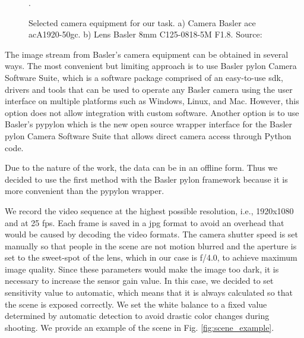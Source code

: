     \begin{figure}[h]
        \centering
        \qquad
        \caption{Selected camera equipment for our task. a) Camera Basler ace acA1920-50gc. b) Lens Basler 8mm  C125-0818-5M F1.8. Source: \cite{baslercamera, baslerlens}}.
        \label{fig:camera_equipment}
    \end{figure}
    
    The image stream from Basler's camera equipment can be obtained in several ways. The most convenient but limiting approach is to use Basler pylon Camera Software Suite, which is a software package comprised of an easy-to-use \gls{sdk}, drivers and tools that can be used to operate any Basler camera using the user interface on multiple platforms such as Windows, Linux, and Mac. However, this option does not allow integration with custom software. Another option is to use Basler's pypylon \cite{baslerpypylon} which is the new open source wrapper interface for the Basler pylon Camera Software Suite that allows direct camera access through Python code.
    
    Due to the nature of the work, the data can be in an offline form. Thus we decided to use the first method with the Basler pylon framework because it is more convenient than the pypylon wrapper.
    
    We record the video sequence at the highest possible resolution, i.e., 1920x1080 and at 25 \gls{fps}. Each frame is saved in a jpg format to avoid an overhead that would be caused by decoding the video formats. The camera shutter speed is set manually so that people in the scene are not motion blurred and the aperture is set to the sweet-spot of the lens, which in our case is f/4.0, to achieve maximum image quality. Since these parameters would make the image too dark, it is necessary to increase the sensor gain value. In this case, we decided to set sensitivity value to automatic, which means that it is always calculated so that the scene is exposed correctly.  We set the white balance to a fixed value determined by automatic detection to avoid drastic color changes during shooting. We provide an example of the scene in Fig. \ref{fig:scene_example}.

